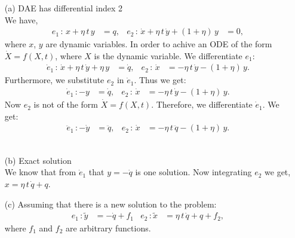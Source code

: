 \begin{enumerate}
	\item[(a)] DAE has differential index 2 \\
	We have,
	\begin{align*}
		e_1\,:\,x + \eta\,t\,y &= q, & e_2\,:\,\dot x + \eta\,t\,\dot y + \left(1 + \eta\right)\,y &= 0,
	\end{align*}
	where $x$, $y$ are dynamic variables. In order to achive an ODE of the form $\dot X = f(X,t)$, where $X$ is the dynamic variable. We differentiate $e_1$:
	\begin{align*}
		\dot e_1\,:\,\dot x + \eta\,t\,\dot y + \eta\,y &= \dot q, & e_2\,:\,\dot x &= -\eta\,t\,\dot y - \left(1 + \eta\right)\,y.
	\end{align*}
	Furthermore, we substitute $e_2$ in $\dot e_1$. Thus we get:
	\begin{align*}
		\dot e_1\,: -y &= \dot q, & e_2\,:\,\dot x &= -\eta\,t\,\dot y - \left(1 + \eta\right)\,y.
	\end{align*}
	Now $e_2$ is not of the form $\dot X = f(X,t)$. Therefore, we differentiate $ \dot e_1 $. We get:
	\begin{align*}
		\ddot e_1\,: -\dot y &= \ddot q, & e_2\,:\,\dot x &= -\eta\,t\,\ddot q - \left(1 + \eta\right)\,y.
	\end{align*}
	\\
	\item[(b)] Exact solution \\
	We know that from $\dot e_1$ that $y = -\dot q$ is one solution. Now integrating $e_2$ we get, $ x = \eta\,t\,\dot q + q $.
	\item[(c)] Assuming that there is a new solution to the problem:
	\begin{align*}
		e_1\,:\tilde y &= -\dot q + f_1 & e_2\,:\tilde x &= \eta\,t\,\dot q + q + f_2,
	\end{align*}
	where $f_1$ and $f_2$ are arbitrary functions. 
	

\end{enumerate}
